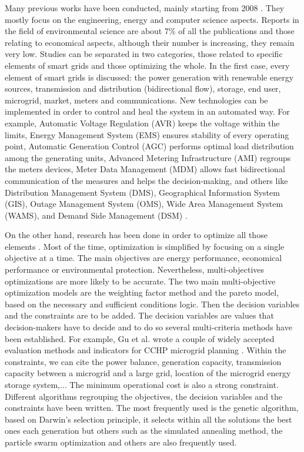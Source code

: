 Many previous works have been conducted, mainly starting from 2008 \cite{vakulenko2021systematic}. They mostly focus on the engineering, energy and computer science aspects. Reports in the field of environmental science are about 7\% of all the publications and those relating to economical aspects, although their number is increasing, they remain very low. Studies can be separated in two categories, those related to specific elements of smart grids and those optimizing the whole. In the first case, every element of smart grids is discussed: the power generation with renewable energy sources, transmission and distribution (bidirectional flow), storage, end user, microgrid, market, meters and communications. New technologies can be implemented in order to control and heal the system in an automated way. For example, Automatic Voltage Regulation (AVR) keeps the voltage within the limits, Energy Management System (EMS) ensures stability of every operating point, Automatic Generation Control (AGC) performs optimal load distribution among the generating units, Advanced Metering Infrastructure (AMI) regroups the meters devices, Meter Data Management (MDM) allows fast bidirectional communication of the measures and helps the decision-making, and others like Distribution Management System (DMS), Geographical Information System (GIS), Outage Management System (OMS), Wide Area Management System (WAMS), and Demand Side Management (DSM) \cite{alotaibi2020comprehensive}. 

On the other hand, research has been done in order to optimize all those elements \cite{gao2021review}. Most of the time, optimization is simplified by focusing on a single objective at a time. The main objectives are energy performance, economical performance or environmental protection. Nevertheless, multi-objectives optimizations are more likely to be accurate. The two main multi-objective optimization models are the weighting factor method and the pareto model, based on the necessary and sufficient conditions logic. Then the decision variables and the constraints are to be added. The decision variables are values that decision-makers have to decide and to do so several multi-criteria methods have been established. For example, Gu et al. wrote a couple of widely accepted evaluation methods and indicators for CCHP microgrid planning \cite{gao2021review}. Within the constraints, we can cite the power balance, generation capacity, transmission capacity between a microgrid and a large grid, location of the microgrid energy storage system,... The minimum operational cost is also a strong constraint. Different algorithms regrouping the objectives, the decision variables and the constraints have been written. The most frequently used is the genetic algorithm, based on Darwin’s selection principle, it selects within all the solutions the best ones each generation but others such as the simulated annealing method, the particle swarm optimization and others are also frequently used.

